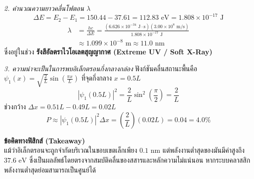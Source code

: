 \begin{psctexample}
\textit{2. คำนวณความยาวคลื่นโฟตอน $\lambda$}
\begin{equation}
\Delta E = E_2 - E_1 = 150.44 - 37.61 = 112.83\text{ eV} = 1.808 \times 10^{-17}\text{ J}
\end{equation}
\begin{align}
\lambda &= \frac{hc}{\Delta E} = \frac{(6.626 \times 10^{-34}\text{ J}\cdot\text{s}) (3.00 \times 10^8\text{ m/s})}{1.808 \times 10^{-17}\text{ J}} \nonumber \\
&\approx 1.099 \times 10^{-8}\text{ m} \approx 11.0\text{ nm}
\end{align}
ซึ่งอยู่ในช่วง \textbf{รังสีอัลตราไวโอเลตสุญญากาศ (Extreme UV / Soft X-Ray)}

\textit{3. ความน่าจะเป็นในการพบอิเล็กตรอนกึ่งกลางกล่อง}
ฟังก์ชันคลื่นสถานะพื้นคือ $\psi_1(x) = \sqrt{\frac{2}{L}}\sin\left(\frac{\pi x}{L}\right)$ ที่จุดกึ่งกลาง $x = 0.5L$
\begin{equation}
|\psi_1(0.5L)|^2 = \frac{2}{L}\sin^2\left(\frac{\pi}{2}\right) = \frac{2}{L}
\end{equation}
ช่วงกว้าง $\Delta x = 0.51L - 0.49L = 0.02L$
\begin{equation}
P \approx |\psi_1(0.5L)|^2 \Delta x = \left(\frac{2}{L}\right) (0.02L) = 0.04 = 4.0\%
\end{equation}

\textbf{ข้อคิดทางฟิสิกส์ (Takeaway)} \\
แม้ว่าอิเล็กตรอนจะถูกจำกัดบริเวณในขอบเขตเล็กเพียง $0.1\text{ nm}$ แต่พลังงานต่ำสุดของมันมีค่าสูงถึง $37.6\text{ eV}$ ซึ่งเป็นผลลัพธ์โดยตรงจากสมบัติคลื่นของสสารและหลักความไม่แน่นอน หากระบบคลาสสิก พลังงานต่ำสุดย่อมสามารถเป็นศูนย์ได้
\qedexam
\end{psctexample}

